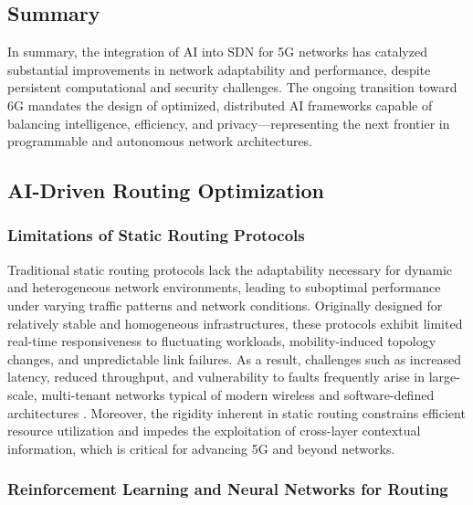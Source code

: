 \documentclass[sigconf]{acmart}
\begin{document}
\subsection{Summary}

In summary, the integration of AI into SDN for 5G networks has catalyzed substantial improvements in network adaptability and performance, despite persistent computational and security challenges. The ongoing transition toward 6G mandates the design of optimized, distributed AI frameworks capable of balancing intelligence, efficiency, and privacy—representing the next frontier in programmable and autonomous network architectures.

\subsection{AI-Driven Routing Optimization}

\subsubsection{Limitations of Static Routing Protocols}

Traditional static routing protocols lack the adaptability necessary for dynamic and heterogeneous network environments, leading to suboptimal performance under varying traffic patterns and network conditions. Originally designed for relatively stable and homogeneous infrastructures, these protocols exhibit limited real-time responsiveness to fluctuating workloads, mobility-induced topology changes, and unpredictable link failures. As a result, challenges such as increased latency, reduced throughput, and vulnerability to faults frequently arise in large-scale, multi-tenant networks typical of modern wireless and software-defined architectures \cite{ref53}. Moreover, the rigidity inherent in static routing constrains efficient resource utilization and impedes the exploitation of cross-layer contextual information, which is critical for advancing 5G and beyond networks.

\subsubsection{Reinforcement Learning and Neural Networks for Routing}
\end{document}
